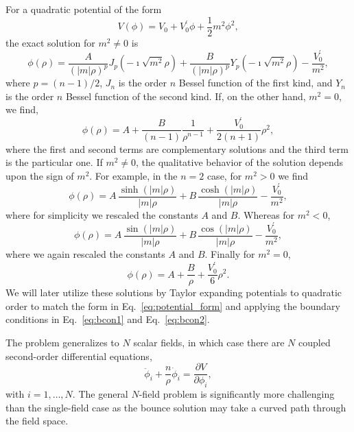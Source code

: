 \documentclass[final,3p,11pt,pdflatex]{elsarticle}
\renewcommand{\tfrac}{\frac}
\renewcommand{\refeq}[1]{Eq.~\ref{#1}}
\begin{document}
For a quadratic potential of the form
\begin{equation}\label{eq:potential_form}
V(\phi) = V^{\phantom\prime}_0 + V^\prime_0 \phi + \tfrac{1}{2} m^2 \phi^2,
\end{equation}
the exact solution for $m^2 \neq 0$ is
\begin{equation}\label{eq:sol}
\phi(\rho) =  \frac{A}{(|m| \rho)^p} J_p\left(-\imath\sqrt{m^2} \rho\right) + \frac{B}{(|m| \rho)^p} Y_p \left(-\imath \sqrt{m^2} \rho\right) -\frac{V^\prime_0}{m^2},
\end{equation}
where $p = (n-1)/2$, $J_n$ is the order $n$ Bessel function of the first kind, and $Y_n$ is the order $n$ Bessel function of the second kind.  If, on the other hand, $m^2 = 0$, we find,
\begin{equation}
\phi(\rho) = A + \frac{B}{(n-1)} \frac{1}{\rho^{n - 1}}+ \frac{V^\prime_0}{2 (n + 1)} \rho^2 ,
\end{equation}
where the first and second terms are complementary solutions and the third term is the particular one.  If $m^2 \neq 0$, the qualitative behavior of the solution depends upon the sign of $m^2$.  For example, in the $n=2$ case, for $m^2 > 0$ we find
\begin{equation}\label{eq:gt}
\phi(\rho) = A\, \frac{\sinh\left(|m| \rho\right)}{|m|\rho} + B\, \frac{\cosh\left(|m| \rho\right)}{|m|\rho} - \frac{V^\prime_0}{m^2},
\end{equation}
where for simplicity we rescaled the constants $A$ and $B$. Whereas for $m^2 < 0$,
\begin{equation}\label{eq:lt}
\phi(\rho) = A\, \frac{\sin\left(|m| \rho\right)}{|m| \rho} + B\, \frac{\cos\left(|m| \rho\right)}{|m| \rho} - \frac{V^\prime_0}{m^2},
\end{equation}
where we again rescaled the constants $A$ and $B$. Finally for $m^2 = 0$,
\begin{equation}\label{eq:zero}
\phi(\rho) = A + \frac{B}{\rho} + \frac{V^\prime_0}{6} \rho^2.
\end{equation}
We will later utilize these solutions by Taylor expanding potentials to quadratic order to match the form in \refeq{eq:potential_form} and applying the boundary conditions in \refeq{eq:bcon1} and \refeq{eq:bcon2}.

The problem generalizes to $N$ scalar fields, in which case there are $N$
coupled second-order differential equations,
\begin{equation}\label{eq:n_dim_bounce}
\ddot \phi_i + \tfrac{n}{\rho}\dot\phi_i = \frac{\partial V}{\partial \phi_i},
\end{equation}
with $i=1,\ldots, N$.  The general $N$-field problem is significantly more challenging than the single-field case as the bounce solution may take a curved path through the field space.
\end{document}
